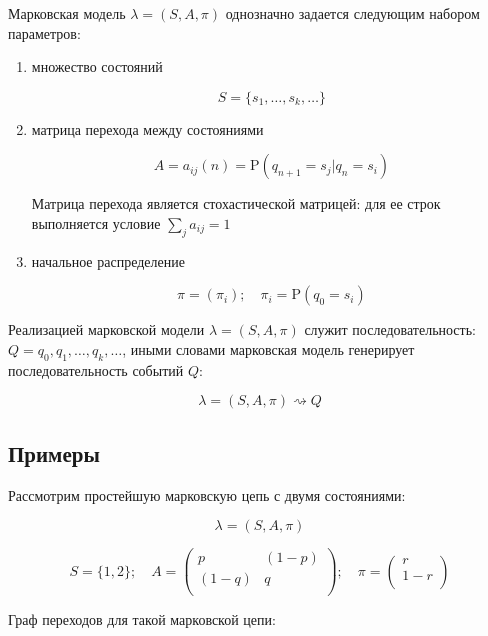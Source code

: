 \documentclass[letterpaper, 11pt]{article}
\newcommand{\prob}{\mathrm{P}}
\begin{document}
Марковская модель $\lambda=(S,A,\pi)$ однозначно задается следующим набором параметров:

\begin{enumerate}

\item множество состояний

$$S=\{s_1,\ldots,s_k,\ldots\}$$

\item матрица перехода между состояниями 

$$A=a_{ij}(n)=\prob(q_{n+1}=s_j|q_{n}=s_i)$$

Матрица перехода является стохастической матрицей: для ее строк выполняется условие $\sum\limits_{j}a_{ij}=1$

\item начальное распределение

$$\pi=(\pi_i);\quad\pi_i=\prob(q_0=s_i)$$

\end{enumerate}

Реализацией марковской модели $\lambda=(S,A,\pi)$ служит последовательность:  $Q=q_0,q_1,\ldots,q_k,\ldots$, иными словами марковская модель генерирует последовательность событий $Q$:

$$\lambda=(S,A,\pi) \rightsquigarrow Q$$

\subsection{Примеры}

Рассмотрим простейшую марковскую цепь с двумя состояниями:

$$\lambda=(S,A,\pi)$$

$$S=\{1,2\};
\quad
A=
\begin{pmatrix}
  p & (1-p) \\
  (1-q) & q \\
 \end{pmatrix};
\quad
\pi=
\begin{pmatrix}
  r \\
  1-r \\
 \end{pmatrix}
$$


Граф переходов для такой марковской цепи:

\begin{center}
\end{center}
\end{document}
